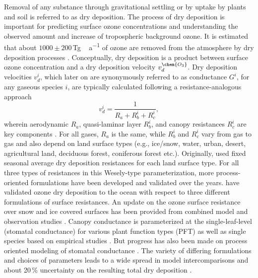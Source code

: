 \documentclass[gmd, manuscript]{copernicus}
\begin{document}
Removal of any substance through gravitational settling or by uptake by plants and soil is referred to as dry deposition. The process of dry deposition is important for predicting surface ozone concentrations and understanding the observed amount and increase of tropospheric background ozone. It is estimated that about $1000 \pm 200$\,\unit{Tg\,a^{-1}} of ozone are removed from the atmosphere by dry deposition processes \citep{ACP:Monks2015}. Conceptually, dry deposition is a product between surface ozone concentration  and a dry deposition velocity $v^\chem{O_3}_d$. Dry deposition velocities $v^i_d$, which later on are synonymously referred to as conductance $G^i$, for any gaseous species $i$, are typically calculated following a resistance-analogous approach
\begin{equation}
  v^i_d = \frac{1}{R_a + R^i_b + R^i_c},
  \label{eq:drydep_velo}
\end{equation}
wherein aerodynamic $R_a$, quasi-laminar layer $R^i_b$, and canopy resistances $R^i_c$ are key components \citep{AE:Wesely1989,ACP:Seinfeld2006}. For all gases, $R_a$ is the same, while $R^i_b$ and $R^i_c$ vary from gas to gas and also depend on land surface types (e.g., ice/snow, water, urban, desert, agricultural land, deciduous forest, coniferous forest etc.). Originally, \citet{AE:Wesely1989} used fixed seasonal average dry deposition resistances for each land surface type. For all three types of resistances in this Wesely-type parameterization, more process-oriented formulations have been developed and validated over the years. \citet{ACP:Luhar2017} have validated ozone dry deposition to the ocean with respect to three different formulations of surface resistances. An update on the ozone surface resistance over snow and ice covered surfaces has been provided from combined model and observation studies \citep[][$v^\chem{O_3}_\text{ice/snow} = 1/10000\,\unit{m\,s^{-1}}$]{ACP:Helmig2007}. Canopy conductance is parameterized at the single-leaf-level (stomatal conductance) for various plant function types (PFT) as well as single species based on empirical studies \citep{PTRS:Jarvis1976, BallBerry1987, ACP:Simpson2012, ICP:MappingManual2017}. But progress has also been made on process oriented modeling of stomatal conductance \citep{AFM:Anderson2000,PP:Buckley2017}. The variety of differing formulations and choices of parameters leads to a wide spread in model intercomparisons \citep{ACP:Hardacre2015,AE:Derwent2018} and about 20\,\unit{\%} uncertainty on the resulting total dry deposition \citep{ACP:Monks2015}.\\
\end{document}
